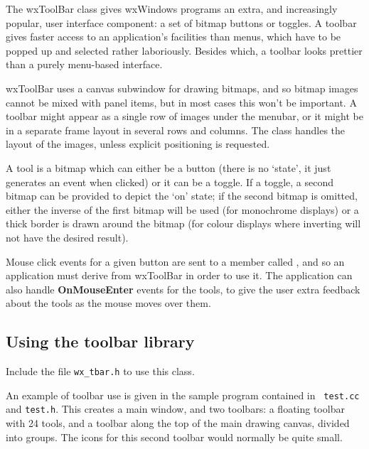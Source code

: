 The wxToolBar class gives wxWindows programs an extra, and increasingly
popular, user interface component: a set of bitmap buttons or toggles.
A toolbar gives faster access to an application's facilities than
menus, which have to be popped up and selected rather laboriously.
Besides which, a toolbar looks prettier than a purely menu-based
interface.

wxToolBar uses a canvas subwindow for drawing bitmaps, and so bitmap
images cannot be mixed with panel items, but in most cases this won't
be important. A toolbar might appear as a single row of images under
the menubar, or it might be in a separate frame layout in several rows
and columns. The class handles the layout of the images, unless explicit
positioning is requested.

A tool is a bitmap which can either be a button (there is no `state',
it just generates an event when clicked) or it can be a toggle. If a
toggle, a second bitmap can be provided to depict the `on' state; if
the second bitmap is omitted, either the inverse of the first bitmap
will be used (for monochrome displays) or a thick border is drawn
around the bitmap (for colour displays where inverting will not have
the desired result).

Mouse click events for a given button are sent to a member called
, and so an application must derive from wxToolBar in order
to use it. The application can also handle {\bf OnMouseEnter} events for
the tools, to give the user extra feedback about the tools as the mouse
moves over them.


\subsection{Using the toolbar library}

Include the file {\tt wx\_tbar.h} to use this class.

An example of toolbar use is given in the sample program contained in {\tt
test.cc} and {\tt test.h}.  This creates a main window, and two
toolbars: a floating toolbar with 24 tools, and a toolbar along the
top of the main drawing canvas, divided into groups.  The icons for
this second toolbar would normally be quite small.

